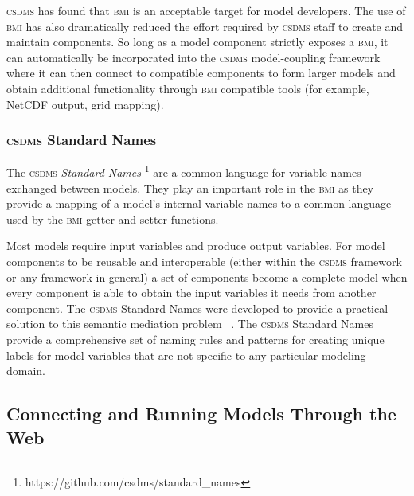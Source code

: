 \documentclass[11pt, oneside]{amsart}
\DeclareRobustCommand{\csdms}{\textsc{csdms}}
\DeclareRobustCommand{\bmi}{\textsc{bmi}}
\begin{document}
\csdms{} has found that \bmi{} is an acceptable target for model developers.
The use of \bmi{} has also dramatically reduced the effort required by
\csdms{} staff to create and maintain components. So long as a model component
strictly exposes a \bmi{}, it can automatically be incorporated into the
\csdms{} model-coupling framework where it can then connect to compatible
components to form larger models and obtain additional functionality through
\bmi{} compatible tools (for example, NetCDF output, grid mapping).

\subsubsection{\csdms{} Standard Names}
\label{sec:standardnames}

The \csdms{} \emph{Standard Names}
\footnote{https://github.com/csdms/standard\_names}
are a common language for variable names exchanged between models. They play
an important role in the \bmi{} as they provide a mapping of a model's
internal variable names to a common language used by the \bmi{} getter and
setter functions.

Most models require input variables and produce output variables. For model
components to be reusable and interoperable (either within the \csdms{}
framework or any framework in general)
a set of components become a complete model when every component is able to
obtain the input variables it needs from another component. The \csdms{}
Standard Names were developed to provide a practical solution to this
semantic mediation problem ~\cite{peckham2012component, syvitski2014plug}.
The \csdms{} Standard Names provide a comprehensive set of naming rules and
patterns for creating unique labels for model variables that are not specific
to any particular modeling domain.

\subsection{Connecting and Running Models Through the Web}
\label{sec:wmt}
\end{document}
